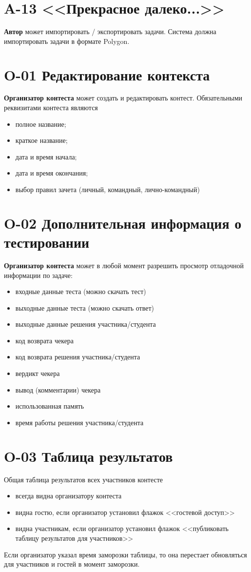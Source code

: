 \documentclass{book}
\newcommand{\newcard}[1]{\newpage \section*{#1}}
\begin{document}
\newcard{A-13 <<Прекрасное далеко...>>}
\textbf{Автор} может импортировать / экспортировать задачи. Система должна импортировать задачи в формате Polygon.



\newcard{O-01 Редактирование контекста}
\textbf{Организатор контеста} может создать и редактировать контест. Обязательными реквизитами контеста являются
\begin{itemize}\setlength{\itemsep}{0pt}
	\item полное название;
	\item краткое название;
	\item дата и время начала;
	\item дата и время окончания;
	\item выбор правил зачета (личный, командный, лично-командный)
\end{itemize}


\newcard{O-02 Дополнительная информация о тестировании}
\textbf{Организатор контеста} может в любой момент разрешить просмотр отладочной информации по задаче:
\begin{itemize}\setlength{\itemsep}{0pt}
	\item входные данные теста (можно скачать тест)
	\item выходные данные теста (можно скачать ответ)
	\item выходные данные решения участника/студента
	\item код возврата чекера
	\item код возврата решения участника/студента
	\item вердикт чекера
	\item вывод (комментарии) чекера
	\item использованная память
	\item время работы решения участника/студента
\end{itemize}


\newcard{O-03 Таблица результатов}
	Общая таблица результатов всех участников контесте 
\begin{itemize}\setlength{\itemsep}{0pt}
	\item всегда видна организатору контеста
	\item видна гостю, если организатор установил флажок <<гостевой доступ>>
	\item видна участникам, если организатор установил флажок <<публиковать таблицу результатов для участников>>
\end{itemize}
	Если организатор указал время заморозки таблицы, то она перестает обновляться для участников и гостей в момент заморозки.
\end{document}
